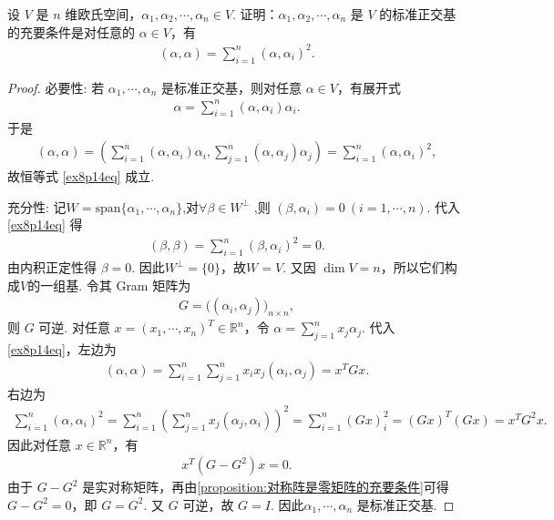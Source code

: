 \documentclass[../../main.tex]{subfiles}%
\begin{document}
\begin{proposition}[Parseval恒等式]\label{proposition:Parseval恒等式}
设 $V$ 是 $n$ 维欧氏空间，$\alpha_1, \alpha_2, \cdots, \alpha_n \in V$. 证明：$\alpha_1, \alpha_2, \cdots, \alpha_n$ 是 $V$ 的标准正交基的充要条件是对任意的 $\alpha \in V$，有
\begin{align}
(\alpha, \alpha) = \sum_{i=1}^n (\alpha, \alpha_i)^2. \label{ex8p14eq}
\end{align}
\end{proposition}
\begin{proof}
{\heiti 必要性:} 若 $\alpha_1, \cdots, \alpha_n$ 是标准正交基，则对任意 $\alpha \in V$，有展开式
\begin{align*}
\alpha = \sum_{i=1}^n (\alpha, \alpha_i)\alpha_i.
\end{align*}
于是
\begin{align*}
(\alpha, \alpha) = \left(\sum_{i=1}^n (\alpha, \alpha_i)\alpha_i, \sum_{j=1}^n (\alpha, \alpha_j)\alpha_j\right)
= \sum_{i=1}^n (\alpha, \alpha_i)^2,
\end{align*}
故恒等式 \eqref{ex8p14eq} 成立.

{\heiti 充分性:} 记$W=\text{span}\{\alpha_1,\cdots,\alpha_n\}$,对$\forall \beta \in W^\bot$ ,则 $(\beta, \alpha_i)=0\ (i=1,\cdots,n)$. 代入 \eqref{ex8p14eq} 得
\begin{align*}
(\beta, \beta) = \sum_{i=1}^n (\beta, \alpha_i)^2 = 0.
\end{align*}
由内积正定性得 $\beta=0$. 因此$W^\bot=\{0\}$，故$W=V$. 又因 $\dim V=n$，所以它们构成$V$的一组基. 令其 Gram 矩阵为
\begin{align*}
G = \bigl((\alpha_i, \alpha_j)\bigr)_{n\times n},
\end{align*}
则 $G$ 可逆.
对任意 $x=(x_1,\cdots,x_n)^T\in \mathbb R^n$，令 $\alpha=\sum_{j=1}^n x_j\alpha_j$. 代入 \eqref{ex8p14eq}，左边为
\begin{align*}
(\alpha, \alpha) = \sum_{i=1}^n\sum_{j=1}^n x_i x_j (\alpha_i, \alpha_j) = x^T G x.
\end{align*}
右边为
\begin{align*}
\sum_{i=1}^n{(\alpha ,\alpha _i)^2}=\sum_{i=1}^n{\left( \sum_{j=1}^n{x_j(\alpha _j,\alpha _i)} \right) ^2}=\sum_{i=1}^n{(Gx)_{i}^{2}}=\left( Gx \right) ^T\left( Gx \right) =x^TG^2x.
\end{align*}
因此对任意 $x\in\mathbb R^n$，有
\begin{align}
x^T (G-G^2)x = 0. \label{Gdiff}
\end{align}
由于 $G-G^2$ 是实对称矩阵，再由\cref{proposition:对称阵是零矩阵的充要条件}可得 $G-G^2=0$，即 $G=G^2$. 又 $G$ 可逆，故 $G=I$. 因此$\alpha_1, \cdots, \alpha_n$ 是标准正交基.
\end{proof}
\end{document}
